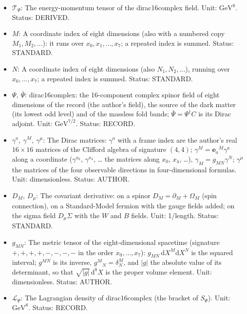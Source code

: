 \documentclass[
  10pt,
]{article}
\providecommand{\tightlist}{%
  \setlength{\itemsep}{0pt}\setlength{\parskip}{0pt}}
\begin{document}
\begin{itemize}
\tightlist
\item
  \(\mathcal{T}_\Psi\): The energy-momentum tensor of the dirac16complex
  field. Unit: \(\mathrm{GeV}^{8}\). Status: DERIVED.
\item
  \(M\): A coordinate index of eight dimensions (also with a numbered
  copy \(M_1, M_2, \dots\)): it runs over \(x_0, x_1, \dots, x_7\); a
  repeated index is summed. Status: STANDARD.
\item
  \(N\): A coordinate index of eight dimensions (also
  \(N_1, N_2, \dots\)), running over \(x_0, \dots, x_7\); a repeated
  index is summed. Status: STANDARD.
\item
  \(\Psi,\ \bar\Psi\): dirac16complex: the 16-component complex spinor
  field of eight dimensions of the record (the author's field), the
  source of the dark matter (its lowest odd level) and of the massless
  fold bands; \(\bar\Psi = \Psi^\dagger C\) is its Dirac adjoint. Unit:
  \(\mathrm{GeV}^{7/2}\). Status: RECORD.
\item
  \(\gamma^a,\ \gamma^M,\ \gamma^\mu\): The Dirac matrices: \(\gamma^a\)
  with a frame index are the author's real \(16 \times 16\) matrices of
  the Clifford algebra of signature \((4, 4)\);
  \(\gamma^M = \mathbf{e}_a{}^M\gamma^a\) along a coordinate
  (\(\gamma^{x_0}\), \(\gamma^{x_4}\), \ldots{} the matrices along
  \(x_0\), \(x_4\), \ldots), \(\gamma_M = g_{MN}\gamma^N\);
  \(\gamma^\mu\) the matrices of the four observable directions in
  four-dimensional formulas. Unit: dimensionless. Status: AUTHOR.
\item
  \(D_M,\ D_\mu\): The covariant derivative: on a spinor
  \(D_M = \partial_M + \Omega_M\) (spin connection), on a Standard-Model
  fermion with the gauge fields added; on the sigma field
  \(D_\mu\Sigma\) with the \(W\) and \(B\) fields. Unit: 1/length.
  Status: STANDARD.
\item
  \(g_{MN}\): The metric tensor of the eight-dimensional spacetime
  (signature \(+,+,+,+,-,-,-,-\) in the order \(x_0, \dots, x_7\)):
  \(g_{MN}\,\mathrm{d}X^M\mathrm{d}X^N\) is the squared interval;
  \(g^{MN}\) is its inverse, \(g^M{}_N = \delta^M_N\), and
  \(\lvert g\rvert\) the absolute value of its determinant, so that
  \(\sqrt{\lvert g\rvert}\,\mathrm{d}^8X\) is the proper volume element.
  Unit: dimensionless. Status: AUTHOR.
\item
  \(\mathcal{L}_\Psi\): The Lagrangian density of dirac16complex (the
  bracket of \(S_\Psi\)). Unit: \(\mathrm{GeV}^{8}\). Status: RECORD.

\end{itemize}
\end{document}
